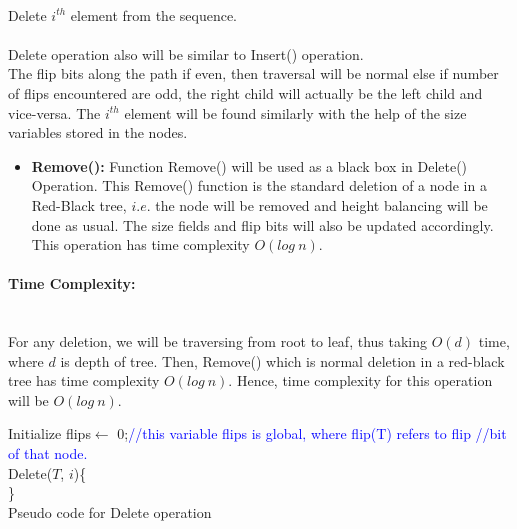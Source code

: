 \documentclass[pdftex,a4paper,12pt]{report}
\begin{document}
\paragraph{} Delete $i^{th}$ element from the sequence.\\\\
Delete operation also will be similar to Insert() operation.\\
The flip bits along the path if even, then traversal will be normal else if number of flips 
encountered are odd, the right child will actually be the left child and vice-versa. 
The $i^{th}$ element will be found similarly with the help of the size variables stored in the nodes.
\begin{itemize}
	\item \textbf{Remove():} Function Remove() will be used as a black box in Delete() Operation. This Remove() function
	is the standard deletion of a node in a Red-Black tree, $i.e.$ the node will be removed and height balancing will be 
	done as usual. The size fields and flip bits will also be updated accordingly. This operation has time complexity 
	$O(log\ n)$.
\end{itemize}

\paragraph{Time Complexity:} \makebox[2pt]{}\\
For any deletion, we will be traversing from root to leaf, thus taking $O(d)$ time, where $d$ is depth of tree. Then, Remove()
which is normal deletion in a red-black tree has time complexity $O(log\ n)$. Hence, time complexity for this operation will
be $O(log\ n)$.
\begin{algorithm}
Initialize flips$\gets$ 0;\makebox[40pt]{}\textcolor{blue}{//this variable flips is global, where flip(T) refers to
 flip \makebox[150pt]{}//bit of that node.}\\
Delete($T$, $i$)\{\\
\}\\
\caption{Pseudo code for Delete operation}
\end{algorithm}
\end{document}
